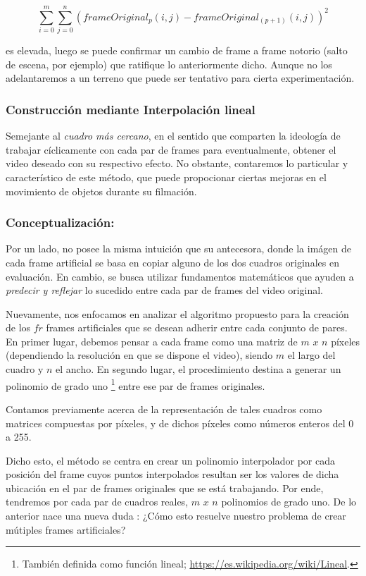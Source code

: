 \[ \sum_{i = 0}^m \sum_{j = 0}^n ( frameOriginal_{p}(i,j) - frameOriginal_{(p+1)}(i,j) )^2 \]

es elevada, luego se puede confirmar un cambio de frame a frame notorio (salto de escena, por ejemplo) que ratifique lo anteriormente dicho. Aunque no los adelantaremos a un terreno que puede ser tentativo para cierta experimentaci\'on.

\subsubsection{Construcci\'on mediante Interpolaci\'on lineal}

Semejante al \emph{cuadro m\'as cercano}, en el sentido que comparten la ideolog\'ia de trabajar c\'iclicamente con cada par de frames para eventualmente, obtener el video deseado con su respectivo efecto. No obstante, contaremos lo particular y caracter\'istico de este m\'etodo, que puede propocionar ciertas mejoras en el movimiento de objetos durante su filmaci\'on.

\subsubsection*{\bf{Conceptualizaci\'on:}}

Por un lado, no posee la misma intuici\'on que su antecesora, donde la im\'agen de cada frame artificial se basa en copiar alguno de los dos cuadros originales en evaluaci\'on. En cambio, se busca utilizar fundamentos matem\'aticos que ayuden a \emph{predecir y reflejar} lo sucedido entre cada par de frames del video original. 

Nuevamente, nos enfocamos en analizar el algoritmo propuesto para la creaci\'on de los $fr$ frames artificiales que se desean adherir entre cada conjunto de pares. En primer lugar, debemos pensar a cada frame como una matriz de $m$ $x$ $n$ p\'ixeles (dependiendo la resoluci\'on en que se dispone el video), siendo $m$ el largo del cuadro y $n$ el ancho. En segundo lugar, el procedimiento destina a generar un polinomio de grado uno \footnote{ Tambi\'en definida como funci\'on lineal; \url{https://es.wikipedia.org/wiki/Lineal}.} entre ese par de frames originales.

Contamos previamente acerca de la representación de tales cuadros como matrices compuestas por p\'ixeles, y de dichos píxeles como números enteros del 0 a 255.

Dicho esto, el m\'etodo se centra en crear un polinomio interpolador por cada posici\'on del frame cuyos puntos interpolados resultan ser los valores de dicha ubicaci\'on en el par de frames originales que se est\'a trabajando. Por ende, tendremos por cada par de cuadros reales, $m$ $x$ $n$ polinomios de grado uno. De lo anterior nace una nueva duda : ¿C\'omo esto resuelve nuestro problema de crear m\'utiples frames artificiales?

